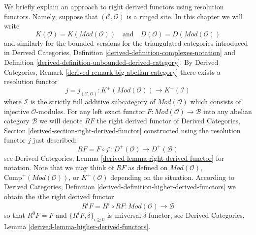 \noindent
We briefly explain an approach to right derived functors using resolution
functors. Namely, suppose that $(\mathcal{C}, \mathcal{O})$ is a ringed site.
In this chapter we will write
$$
K(\mathcal{O}) = K(\textit{Mod}(\mathcal{O}))
\quad
\text{and}
\quad
D(\mathcal{O}) = D(\textit{Mod}(\mathcal{O}))
$$
and similarly for the bounded versions for the triangulated categories
introduced in
Derived Categories, Definition \ref{derived-definition-complexes-notation} and
Definition \ref{derived-definition-unbounded-derived-category}.
By
Derived Categories, Remark \ref{derived-remark-big-abelian-category}
there exists a resolution functor
$$
j = j_{(\mathcal{C}, \mathcal{O})} :
K^{+}(\textit{Mod}(\mathcal{O}))
\longrightarrow
K^{+}(\mathcal{I})
$$
where $\mathcal{I}$ is the strictly full additive subcategory of
$\textit{Mod}(\mathcal{O})$ which consists of injective $\mathcal{O}$-modules.
For any left exact functor $F : \textit{Mod}(\mathcal{O}) \to \mathcal{B}$
into any abelian category $\mathcal{B}$ we will denote $RF$ the
right derived functor of
Derived Categories, Section \ref{derived-section-right-derived-functor}
constructed using the resolution functor $j$ just described:
\begin{equation}
\label{equation-RF}
RF = F \circ j' : D^{+}(\mathcal{O}) \longrightarrow D^{+}(\mathcal{B})
\end{equation}
see
Derived Categories, Lemma \ref{derived-lemma-right-derived-functor}
for notation. Note that we may think of $RF$ as defined on
$\textit{Mod}(\mathcal{O})$, $\text{Comp}^{+}(\textit{Mod}(\mathcal{O}))$, or
$K^{+}(\mathcal{O})$ depending on the situation. According to
Derived Categories, Definition \ref{derived-definition-higher-derived-functors}
we obtain the $i$the right derived functor
\begin{equation}
\label{equation-RFi}
R^iF = H^i \circ RF : \textit{Mod}(\mathcal{O}) \longrightarrow \mathcal{B}
\end{equation}
so that $R^0F = F$ and $\{R^iF, \delta\}_{i \geq 0}$ is universal
$\delta$-functor, see
Derived Categories, Lemma \ref{derived-lemma-higher-derived-functors}.

